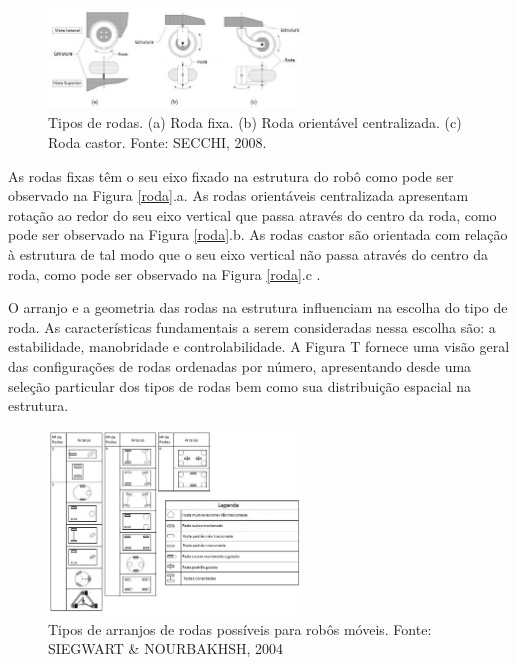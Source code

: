 \begin{figure}[H]
    \centering
    \includegraphics[width=0.6\textwidth]{figuras/roda.eps}
    \caption{Tipos de rodas. (a) Roda fixa. (b) Roda orientável centralizada. (c) Roda castor. Fonte: SECCHI, 2008.}
    \label{fig:roda}
\end{figure}

As rodas fixas têm o seu eixo fixado na estrutura do robô como pode ser observado na Figura \ref{roda}.a. As rodas orientáveis centralizada
apresentam rotação ao redor do seu eixo vertical que passa através do centro da roda, como pode ser observado na Figura \ref{roda}.b. As
rodas castor são orientada com relação à estrutura de tal modo que o seu eixo vertical não passa através do centro da roda, como
pode ser observado na Figura \ref{roda}.c \cite{secchi:2008}. 

O arranjo e a geometria das rodas na estrutura influenciam na escolha do tipo de roda. As características fundamentais a serem
consideradas nessa escolha são: a estabilidade, manobridade e controlabilidade. A Figura T fornece uma visão geral das configurações
de rodas ordenadas por número, apresentando desde uma seleção particular dos tipos de rodas bem como sua distribuição espacial na estrutura.

\begin{figure}[H]
    \centering
    \includegraphics[width=0.6\textwidth]{figuras/arranjos_roda.eps}
    \caption{Tipos de arranjos de rodas possíveis para robôs móveis. Fonte: SIEGWART \& NOURBAKHSH, 2004}
    \label{fig:arranjo_roda}
\end{figure}

